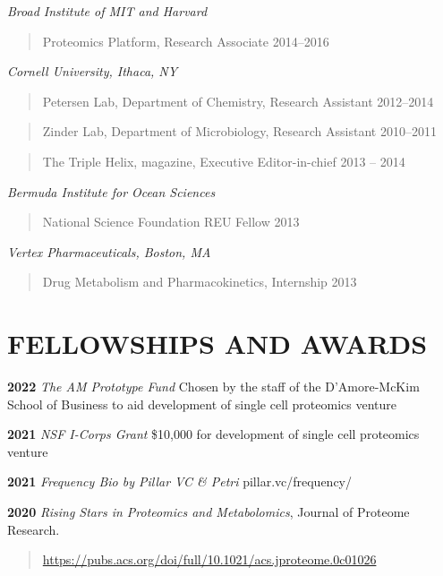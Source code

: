 \documentclass[11pt,]{article}
\begin{document}
\emph{Broad Institute of MIT and Harvard}

\begin{quote}
Proteomics Platform, Research Associate \hfill 2014--2016
\end{quote}

\emph{Cornell University, Ithaca, NY}

\begin{quote}
Petersen Lab, Department of Chemistry, Research Assistant
\hfill 2012--2014
\end{quote}

\begin{quote}
Zinder Lab, Department of Microbiology, Research Assistant
\hfill 2010--2011
\end{quote}

\begin{quote}
The Triple Helix, magazine, Executive Editor-in-chief \hfill 2013 --
2014
\end{quote}

\emph{Bermuda Institute for Ocean Sciences}

\begin{quote}
National Science Foundation REU Fellow \hfill 2013
\end{quote}

\emph{Vertex Pharmaceuticals, Boston, MA}

\begin{quote}
Drug Metabolism and Pharmacokinetics, Internship \hfill 2013
\end{quote}

\hypertarget{fellowships-and-awards}{%
\section{FELLOWSHIPS AND AWARDS}\label{fellowships-and-awards}}

\textbf{2022} \emph{The AM Prototype Fund} Chosen by the staff of the
D'Amore-McKim School of Business to aid development of single cell
proteomics venture

\textbf{2021} \emph{NSF I-Corps Grant} \$10,000 for development of
single cell proteomics venture

\textbf{2021} \emph{Frequency Bio by Pillar VC \& Petri}
pillar.vc/frequency/

\textbf{2020} \emph{Rising Stars in Proteomics and Metabolomics},
Journal of Proteome Research.

\begin{quote}
\url{https://pubs.acs.org/doi/full/10.1021/acs.jproteome.0c01026}
\end{quote}
\end{document}
